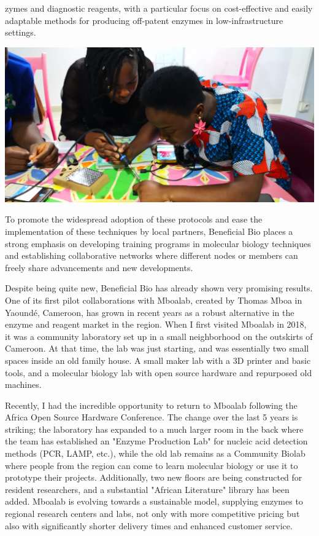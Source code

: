 \documentclass{article}
\begin{document}
\begin{multicols}{2}
zymes and diagnostic reagents, with a particular focus on cost-effective and easily adaptable methods for producing 
off-patent enzymes in low-infrastructure settings. 

\begin{center}
  \includegraphics[width=\linewidth]{minette.jpg}
\end{center}

To promote the widespread adoption of these protocols and ease the implementation of these techniques by local partners, 
Beneficial Bio places a strong emphasis on developing training programs in molecular biology techniques and establishing collaborative networks where different nodes or 
members can freely share advancements and new developments.

Despite being quite new, Beneficial Bio has already shown very promising results. One of its first pilot collaborations with Mboalab, created by Thomas Mboa in Yaoundé, 
Cameroon, has grown in recent years as a robust alternative in the enzyme and reagent market in the region. When I first visited Mboalab in 2018, it was a community 
laboratory set up in a small neighborhood on the outskirts of Cameroon. At that time, the lab was just starting, and was essentially two small spaces inside an old 
family house. A small maker lab with a 3D printer and basic tools, and a molecular biology lab with open source hardware and repurposed old machines.

Recently, I had the incredible opportunity to return to Mboalab following the Africa Open Source Hardware Conference. The change over the last 5 years is striking; 
the laboratory has expanded to a much larger room in the back where the team has established an "Enzyme Production Lab" for nucleic acid detection methods (PCR, LAMP, etc.), 
while the old lab remains as a Community Biolab where people from the region can come to learn molecular biology or use it to prototype their projects. Additionally, two new 
floors are being constructed for resident researchers, and a substantial "African Literature" library has been added. Mboalab is evolving towards a sustainable model, 
supplying enzymes to regional research centers and labs, not only with more competitive pricing but also with significantly shorter delivery times and enhanced customer service.


\end{multicols}
\end{document}
